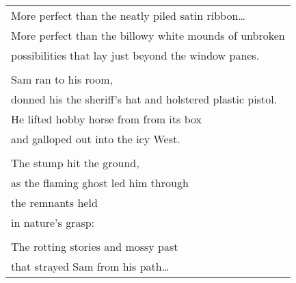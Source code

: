 \documentclass{article}
\begin{document}
\begin{center}
\begin{tabular}{l}
\hspace*{2ex}More perfect than the neatly piled satin ribbon\ldots \\
\hspace*{2ex}More perfect than the billowy white mounds of unbroken \\
\hspace*{2ex}possibilities that lay just beyond the window panes. \\
\\
\hspace*{2ex}Sam ran to his room, \\
\hspace*{2ex}donned his the sheriff's hat and holstered plastic pistol. \\
\hspace*{2ex}He lifted hobby horse from from its box \\
\hspace*{2ex}and galloped out into the icy West. \\
\\
The stump hit the ground, \\
as the flaming ghost led him through \\
the remnants held \\
in nature's grasp: \\
\\
The rotting stories and mossy past \\
that strayed Sam from his path\ldots \\


\end{tabular}
\end{center}
\end{document}
